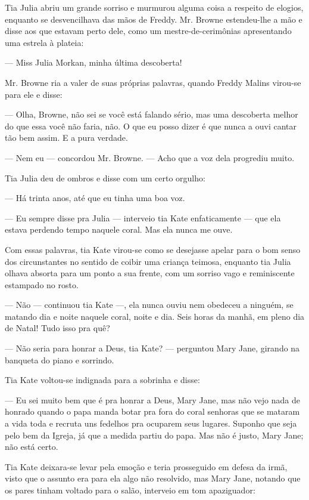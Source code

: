 Tia Julia abriu um grande sorriso e murmurou alguma coisa a respeito
de elogios, enquanto se desvencilhava das mãos de Freddy. Mr. Browne
estendeu-lhe a mão e disse aos que estavam perto dele, como um
mestre-de-cerimônias apresentando uma estrela à plateia:

--- Miss Julia Morkan, minha última descoberta!

Mr. Browne ria a valer de suas próprias palavras, quando Freddy Malins
virou-se para ele e disse:

--- Olha, Browne, não sei se você está falando sério, mas uma
descoberta melhor do que essa você não faria, não. O que eu posso
dizer é que nunca a ouvi cantar tão bem assim. E a pura verdade.

--- Nem eu --- concordou Mr. Browne. --- Acho que a voz dela progrediu
muito.

Tia Julia deu de ombros e disse com um certo orgulho:

--- Há trinta anos, até que eu tinha uma boa voz.

--- Eu sempre disse pra Julia --- interveio tia Kate enfaticamente 
--- que ela estava perdendo tempo naquele coral. Mas ela nunca me
ouve.

Com essas palavras, tia Kate virou-se como se desejasse apelar para o
bom senso dos circunstantes no sentido de coibir uma criança teimosa,
enquanto tia Julia olhava absorta para um ponto a sua frente, com um
sorriso vago e reminiscente estampado no rosto.

--- Não --- continuou tia Kate ---, ela nunca ouviu nem obedeceu a
ninguém, se matando dia e noite naquele coral, noite e dia. Seis horas
da manhã, em pleno dia de Natal! Tudo isso pra quê?

--- Não seria para honrar a Deus, tia Kate? --- perguntou Mary Jane,
girando na banqueta do piano e sorrindo.

Tia Kate voltou-se indignada para a sobrinha e disse:

--- Eu sei muito bem que é pra honrar a Deus, Mary Jane, mas não vejo
nada de honrado quando o papa manda botar pra fora do coral senhoras
que se mataram a vida toda e recruta uns
fedelhos pra ocuparem seus lugares. Suponho que seja pelo bem da
Igreja, já que a medida partiu do papa. Mas não é justo, Mary Jane;
não está certo.

Tia Kate deixara-se levar pela emoção e teria prosseguido em defesa da
irmã, visto que o assunto era para ela algo não resolvido, mas
Mary Jane, notando que os pares tinham voltado para o salão, interveio
em tom apaziguador:

